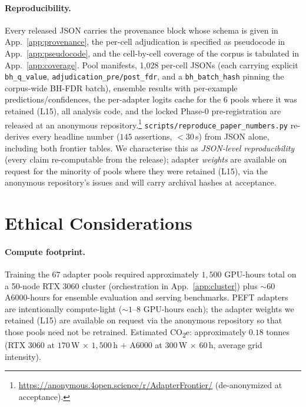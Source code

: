 \documentclass[11pt]{article}
\begin{document}
\paragraph{Reproducibility.} Every released JSON carries the provenance block whose schema is given in App.~\ref{app:provenance}, the per-cell adjudication is specified as pseudocode in App.~\ref{app:pseudocode}, and the cell-by-cell coverage of the corpus is tabulated in App.~\ref{app:coverage}. Pool manifests, 1{,}028 per-cell JSONs (each carrying explicit \texttt{bh\_q\_value}, \texttt{adjudication\_\allowbreak pre/\allowbreak post\_\allowbreak fdr}, and a \texttt{bh\_batch\_hash} pinning the corpus-wide BH-FDR batch), ensemble results with per-example predictions/confidences, the per-adapter logits cache for the $6$ pools where it was retained (L15), all analysis code, and the locked Phase-0 pre-registration are released at an anonymous repository.\footnote{\url{https://anonymous.4open.science/r/AdapterFrontier/} (de-anonymized at acceptance).} \texttt{scripts/\allowbreak reproduce\_\allowbreak paper\_\allowbreak numbers.\allowbreak py} re-derives every headline number ($145$ assertions, ${<}30$\,s) from JSON alone, including both frontier tables. We characterise this as \emph{JSON-level reproducibility} (every claim re-computable from the release); adapter \emph{weights} are available on request for the minority of pools where they were retained (L15), via the anonymous repository's issues and will carry archival hashes at acceptance.

\section*{Ethical Considerations}

\paragraph{Compute footprint.} Training the 67 adapter pools required approximately $1{,}500$ GPU-hours total on a 50-node RTX 3060 cluster (orchestration in App.~\ref{app:cluster}) plus $\sim$$60$ A6000-hours for ensemble evaluation and serving benchmarks. PEFT adapters are intentionally compute-light ($\sim$$1$--$8$ GPU-hours each); the adapter weights we retained (L15) are available on request via the anonymous repository so that those pools need not be retrained. Estimated CO\textsubscript{2}e: approximately $0.18$ tonnes (RTX 3060 at $170$\,W $\times$ $1{,}500$\,h $+$ A6000 at $300$\,W $\times$ $60$\,h, average grid intensity).
\end{document}
